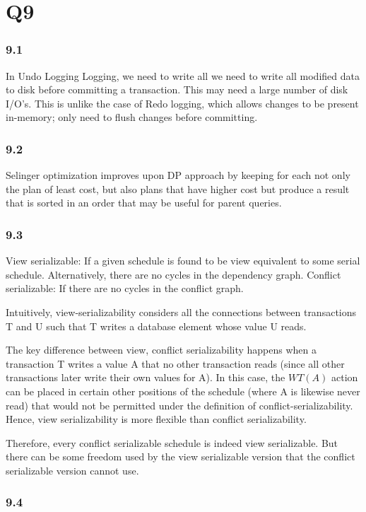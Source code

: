 \documentclass{article}
\begin{document}
\section{Q9}
\subsubsection{9.1}
In Undo Logging Logging, we need to write all we need to write all modified
data to disk before committing a transaction.  This may need a large number of disk
I/O’s. This is unlike the case of Redo logging, which allows changes to be
present in-memory; only need to flush changes before committing.

\subsubsection{9.2}
Selinger optimization improves upon DP approach by keeping for
each  not only the plan of least cost, but also plans that have higher
cost but produce a result that is sorted in an order that may
be useful for parent queries.
\subsubsection{9.3}

View serializable: If a given schedule is found to be view equivalent to some serial schedule. Alternatively,
  there are no cycles in the dependency graph.
Conflict serializable: If there are no cycles in the conflict graph.


Intuitively, view-serializability considers all the connections between
transactions T and U such that T writes a database element whose value U
reads. 

The key difference between view, conflict serializability happens
when a transaction T writes a value A that no other transaction reads (since
all other transactions later write their own values for A). In this case, the
$WT(A)$ action can be placed in certain other positions of the schedule (where A
is likewise never read) that would not be permitted under the definition of
conflict-serializability. Hence, view serializability is more flexible
than conflict serializability.

Therefore, every conflict serializable schedule is indeed view serializable.
But there can be some freedom used by the view serializable version that
the conflict serializable version cannot use.


\subsubsection{9.4}
\end{document}
